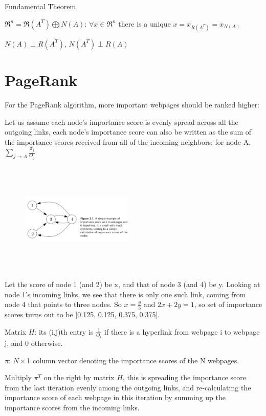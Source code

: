 Fundamental Theorem

$\Re^n = \Re(A^T) \bigoplus N(A)$: $\forall x\in \Re^n$ there is a unique $x = x_{R(A^T)} = x_{N(A)}$ 

$N(A) \perp R(A^T)$, $N(A^T) \perp R(A)$


\section{PageRank}


For the PageRank algorithm, more important webpages should be ranked higher:


Let us assume each node's importance score is evenly spread across all the outgoing links, each node’s importance score can also be written as the sum of the importance scores received from all of the incoming neighbors: for node A, $\sum_{j \rightarrow A}\frac{\pi_j}{O_j}$


\begin{figure}
	\centering
	\includegraphics[width=2.1in,height=2.1in]{figures/ch03/figure0.jpg}
\end{figure}


Let the score of node 1 (and 2) be x, and that of node 3 (and 4) be y. Looking at node 1’s incoming links, we see that there is only one such link, coming from node 4 that points to three nodes. So $x = \frac{y}{3}$ and $2x + 2y = 1$, so set of importance scores turns out to be [0.125, 0.125, 0.375, 0.375].

Matrix $H$: its (i,j)th entry is $\frac{1}{O_i}$ if there is a hyperlink from webpage i to webpage j, and 0 otherwise.

$\pi$: $N \times$1 column vector denoting the importance scores of the N webpages.

Multiply $\pi^T$ on the right by matrix $H$, this is spreading the importance score from the last iteration evenly among the outgoing links, and re-calculating the importance score of each webpage in this iteration by summing up the importance scores from the incoming links.

